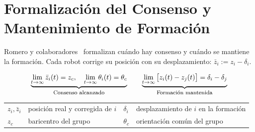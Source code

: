 \section{Formalización del Consenso y Mantenimiento de Formación}

Romero y colaboradores~\cite{romero2024global} formalizan cuándo hay consenso y cuándo se mantiene la formación. Cada robot corrige su posición con su desplazamiento: $\bar{z}_i := z_i - \delta_i$.

\begin{equation*}
    \underbrace{\lim_{t\to\infty} \bar{z}_i(t) = z_c, \quad \lim_{t\to\infty} \theta_i(t) = \theta_c}_{\text{\footnotesize Consenso alcanzado}}
    \qquad
    \underbrace{\lim_{t\to\infty} \big[z_i(t) - z_j(t)\big] = \delta_i - \delta_j}_{\text{\footnotesize Formación mantenida}}
\end{equation*}

{\footnotesize
\noindent
\begin{tabular}{l@{\ }l@{\qquad}l@{\ }l}
$z_i,\bar{z}_i$ & posición real y corregida de $i$ & $\delta_i$ & desplazamiento de $i$ en la formación \\
$z_c$ & baricentro del grupo & $\theta_c$ & orientación común del grupo \\
\end{tabular}
}
